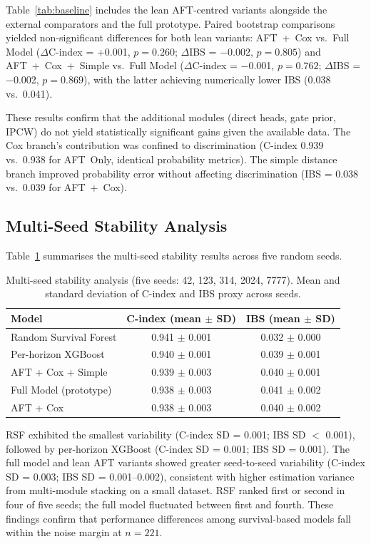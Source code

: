 \documentclass[fire,article,submit,pdftex]{../Definitions/mdpi}
\begin{document}
Table~\ref{tab:baseline} includes the lean AFT-centred variants alongside the external comparators and the full prototype.
Paired bootstrap comparisons yielded non-significant differences for both lean variants: AFT~+~Cox vs.\ Full Model ($\Delta$C-index = +0.001, $p = 0.260$; $\Delta$IBS = $-$0.002, $p = 0.805$) and AFT~+~Cox~+~Simple vs.\ Full Model ($\Delta$C-index = $-$0.001, $p = 0.762$; $\Delta$IBS = $-$0.002, $p = 0.869$), with the latter achieving numerically lower IBS (0.038 vs.\ 0.041).

These results confirm that the additional modules (direct heads, gate prior, IPCW) do not yield statistically significant gains given the available data.
The Cox branch's contribution was confined to discrimination (C-index 0.939 vs.\ 0.938 for AFT~Only, identical probability metrics).
The simple distance branch improved probability error without affecting discrimination (IBS = 0.038 vs.\ 0.039 for AFT~+~Cox).

\subsection{Multi-Seed Stability Analysis}\label{sec:stability}

Table~\ref{tab:stability} summarises the multi-seed stability results across five random seeds.

\begin{table}[!ht]
\caption{Multi-seed stability analysis (five seeds: 42, 123, 314, 2024, 7777). Mean and standard deviation of C-index and IBS proxy across seeds.}\label{tab:stability}
\begin{tabular}{lcc}
\toprule
\textbf{Model} & \textbf{C-index (mean $\pm$ SD)} & \textbf{IBS (mean $\pm$ SD)} \\
\midrule
Random Survival Forest & 0.941 $\pm$ 0.001 & 0.032 $\pm$ 0.000 \\
Per-horizon XGBoost    & 0.940 $\pm$ 0.001 & 0.039 $\pm$ 0.001 \\
AFT + Cox + Simple     & 0.939 $\pm$ 0.003 & 0.040 $\pm$ 0.001 \\
Full Model (prototype) & 0.938 $\pm$ 0.003 & 0.041 $\pm$ 0.002 \\
AFT + Cox              & 0.938 $\pm$ 0.003 & 0.040 $\pm$ 0.002 \\
\bottomrule
\end{tabular}
\end{table}

RSF exhibited the smallest variability (C-index SD = 0.001; IBS SD $<$ 0.001), followed by per-horizon XGBoost (C-index SD = 0.001; IBS SD = 0.001).
The full model and lean AFT variants showed greater seed-to-seed variability (C-index SD = 0.003; IBS SD = 0.001--0.002), consistent with higher estimation variance from multi-module stacking on a small dataset.
RSF ranked first or second in four of five seeds; the full model fluctuated between first and fourth.
These findings confirm that performance differences among survival-based models fall within the noise margin at $n = 221$.
\end{document}
